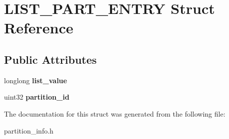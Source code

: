 \hypertarget{structLIST__PART__ENTRY}{}\section{L\+I\+S\+T\+\_\+\+P\+A\+R\+T\+\_\+\+E\+N\+T\+RY Struct Reference}
\label{structLIST__PART__ENTRY}
\subsection*{Public Attributes}
\begin{DoxyCompactItemize}
\item 
\mbox{\label{structLIST__PART__ENTRY_a8aeb666986af5a1292f7f6ccea37a1eb}} 
longlong {\bfseries list\+\_\+value}
\item 
\mbox{\label{structLIST__PART__ENTRY_a4aacca06b17f88664cc41899a475a046}} 
uint32 {\bfseries partition\+\_\+id}
\end{DoxyCompactItemize}


The documentation for this struct was generated from the following file\+:\begin{DoxyCompactItemize}
\item 
partition\+\_\+info.\+h\end{DoxyCompactItemize}

